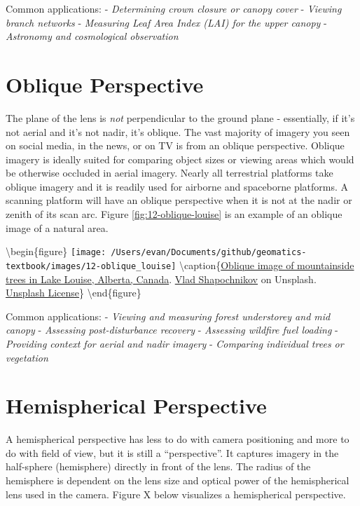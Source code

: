 \documentclass[
]{book}
\begin{document}
Common applications:
- \emph{Determining crown closure or canopy cover}
- \emph{Viewing branch networks}
- \emph{Measuring Leaf Area Index (LAI) for the upper canopy}
- \emph{Astronomy and cosmological observation}

\hypertarget{oblique-perspective}{%
\section{Oblique Perspective}\label{oblique-perspective}}

The plane of the lens is \emph{not} perpendicular to the ground plane - essentially, if it's not aerial and it's not nadir, it's oblique. The vast majority of imagery you seen on social media, in the news, or on TV is from an oblique perspective. Oblique imagery is ideally suited for comparing object sizes or viewing areas which would be otherwise occluded in aerial imagery. Nearly all terrestrial platforms take oblique imagery and it is readily used for airborne and spaceborne platforms. A scanning platform will have an oblique perspective when it is not at the nadir or zenith of its scan arc. Figure \ref{fig:12-oblique-louise} is an example of an oblique image of a natural area.

\textbackslash begin\{figure\}
\texttt{[image: /Users/evan/Documents/github/geomatics-textbook/images/12-oblique\_louise]} \textbackslash caption\{\href{https://unsplash.com/photos/P36KI_ws3vs}{Oblique image of mountainside trees in Lake Louise, Alberta, Canada}. \href{https://unsplash.com/@vladshap}{Vlad Shapochnikov} on Unsplash. \href{https://unsplash.com/license}{Unsplash License}\}\label{fig:12-oblique-louise}
\textbackslash end\{figure\}

Common applications:
- \emph{Viewing and measuring forest understorey and mid canopy}
- \emph{Assessing post-disturbance recovery}
- \emph{Assessing wildfire fuel loading}
- \emph{Providing context for aerial and nadir imagery}
- \emph{Comparing individual trees or vegetation}

\hypertarget{hemispherical-perspective}{%
\section{Hemispherical Perspective}\label{hemispherical-perspective}}

A hemispherical perspective has less to do with camera positioning and more to do with field of view, but it is still a ``perspective''. It captures imagery in the half-sphere (hemisphere) directly in front of the lens. The radius of the hemisphere is dependent on the lens size and optical power of the hemispherical lens used in the camera. Figure X below visualizes a hemispherical perspective.
\end{document}

